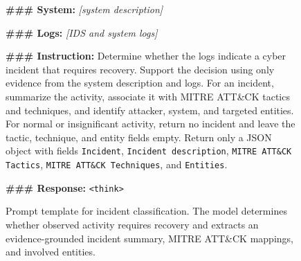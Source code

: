 \documentclass[sigconf]{acmart}
\begin{document}
\begin{figure}[t]
\centering
\begin{tcolorbox}[
  title=Incident Classification Prompt Template,
  colback=Purple!5,
  colframe=Purple!60,
  boxrule=0.5pt,
  arc=2pt,
  left=5pt,
  right=5pt,
  top=5pt,
  bottom=5pt]
\footnotesize
\textbf{\#\#\# System:} \emph{[system description]}

\textbf{\#\#\# Logs:} \emph{[IDS and system logs]}

\textbf{\#\#\# Instruction:}
Determine whether the logs indicate a cyber incident that requires recovery.
Support the decision using only evidence from the system description and logs.
For an incident, summarize the activity, associate it with MITRE ATT\&CK
tactics and techniques, and identify attacker, system, and targeted entities.
For normal or insignificant activity, return no incident and leave the tactic,
technique, and entity fields empty. Return only a JSON object with fields
\texttt{Incident}, \texttt{Incident description},
\texttt{MITRE ATT\&CK Tactics}, \texttt{MITRE ATT\&CK Techniques}, and
\texttt{Entities}.

\textbf{\#\#\# Response:}
\texttt{<think>}
\end{tcolorbox}
\caption{Prompt template for incident classification. The model determines
whether observed activity requires recovery and extracts an evidence-grounded
incident summary, MITRE ATT\&CK mappings, and involved entities.}
\label{fig:incident-prompt}
\end{figure}
\end{document}
